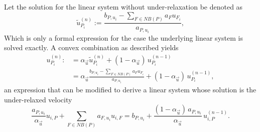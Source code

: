     Let  the solution for the linear system without under-relaxation be denoted as
    \begin{displaymath}
      \tilde{u}_{P_i}^{(n)} := \frac{b_{P,u_i} - \sum_{F \in NB(P)} a_F u_{F_i}}{a_{P,u_i}},
    \end{displaymath}
    Which is only a formal expression for the case the underlying linear system is solved exactly. A convex combination as described yields
    \begin{align*}
      u_{P_i}^{(n)} :&= \alpha_{\vec{u}} \tilde{u}_{P_i}^{(n)} + (1 - \alpha_{\vec{u}} )\, u_{P_i}^{(n-1)} \\[0.5em]
                     &= \alpha_{\vec{u}} \frac{b_{P,u_i} - \sum_{F \in NB(P)} a_F u_{F_i}}{a_{P,u_i}} + (1 - \alpha_{\vec{u}} )\, u_{P_i}^{(n-1)},
    \end{align*}
    an expression that can be modified to derive a linear system whose solution is the under-relaxed velocity
    \begin{displaymath}
      \frac{a_{P,u_i}}{\alpha_{\vec{u}}} u_{i,P} + \sum_{F \in NB(P)} a_{F,u_i} u_{i,F} 
      = 
      b_{P,u_i} + \frac{(1 - \alpha_{\vec{u}})\, a_{P,u_i}}{\alpha_{\vec{u}}}\, u_{i,P}^{(n-1)}. 
    \end{displaymath}

